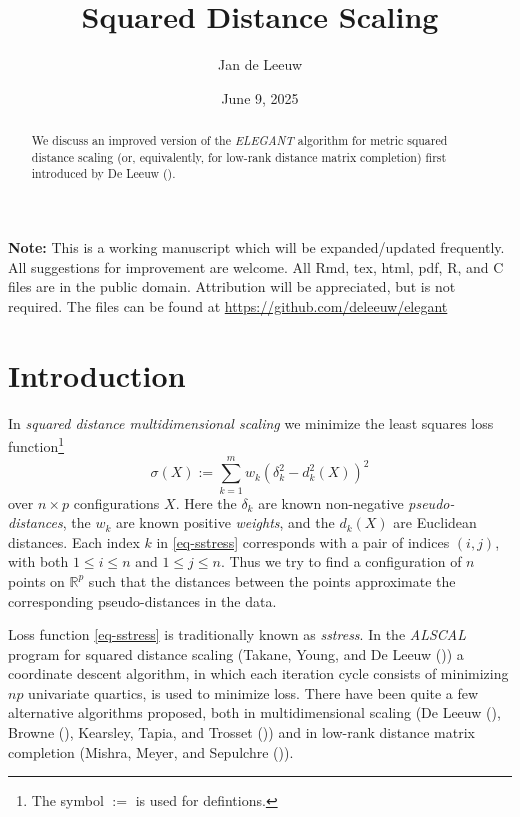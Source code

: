 \documentclass[
  12pt,
  letterpaper,
  DIV=11,
  numbers=noendperiod]{scrartcl}
\title{Squared Distance Scaling}
\author{Jan de Leeuw}
\date{June 9, 2025}
\newcommand{\sectionbreak}{\clearpage}
\renewcommand*\contentsname{Table of contents}
\newcommand\contentsname{Table of contents}
\begin{document}
\maketitle
\begin{abstract}
We discuss an improved version of the \emph{ELEGANT} algorithm for
metric squared distance scaling (or, equivalently, for low-rank distance
matrix completion) first introduced by De Leeuw
().
\end{abstract}

\renewcommand*\contentsname{Table of contents}
{
\hypersetup{linkcolor=}
\setcounter{tocdepth}{3}
\tableofcontents
}

\textbf{Note:} This is a working manuscript which will be
expanded/updated frequently. All suggestions for improvement are
welcome. All Rmd, tex, html, pdf, R, and C files are in the public
domain. Attribution will be appreciated, but is not required. The files
can be found at \url{https://github.com/deleeuw/elegant}

\sectionbreak

\section{Introduction}\label{introduction}

In \emph{squared distance multidimensional scaling} we minimize the
least squares loss
function\footnote{The symbol $:=$ is used for defintions.}
\begin{equation}
\sigma(X):=\sum_{k=1}^m w_k(\delta_k^2-d_k^2(X))^2\label{eq-sstress}
\end{equation} over \(n\times p\) configurations \(X\). Here the
\(\delta_k\) are known non-negative \emph{pseudo-distances}, the \(w_k\)
are known positive \emph{weights}, and the \(d_k(X)\) are Euclidean
distances. Each index \(k\) in \eqref{eq-sstress} corresponds with a
pair of indices \((i,j)\), with both \(1\leq i\leq n\) and
\(1\leq j\leq n\). Thus we try to find a configuration of \(n\) points
on \(\mathbb{R}^p\) such that the distances between the points
approximate the corresponding pseudo-distances in the data.

Loss function \eqref{eq-sstress} is traditionally known as
\emph{sstress}. In the \emph{ALSCAL} program for squared distance
scaling (Takane, Young, and De Leeuw
()) a coordinate descent
algorithm, in which each iteration cycle consists of minimizing \(np\)
univariate quartics, is used to minimize loss. There have been quite a
few alternative algorithms proposed, both in multidimensional scaling
(De Leeuw (), Browne
(), Kearsley, Tapia, and Trosset
()) and in low-rank
distance matrix completion (Mishra, Meyer, and Sepulchre
()).
\end{document}

